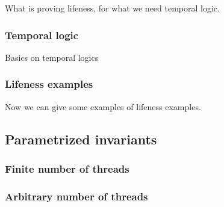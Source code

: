 What is proving lifeness, for what we need temporal logic.

\subsubsection{Temporal logic}

Basics on temporal logics

\subsubsection{Lifeness examples}

Now we can give some examples of lifeness examples.


\subsection{Parametrized invariants}

\subsubsection{Finite number of threads}

\subsubsection{Arbitrary number of threads}

